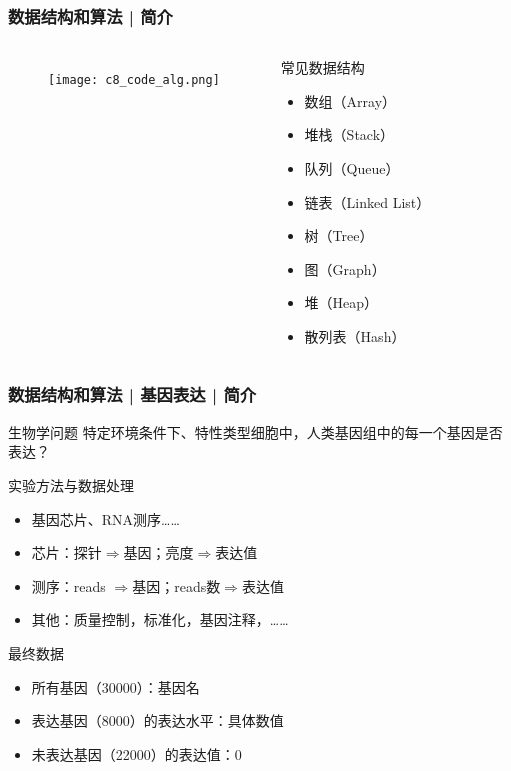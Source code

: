 \begin{frame}
  \frametitle{数据结构和算法 | 简介}
  \begin{columns}
    \begin{figure}
      \centering
      \texttt{[image: c8\_code\_alg.png]}
    \end{figure}
  \begin{block}{常见数据结构}
    \begin{itemize}
      \item 数组（Array）
      \item 堆栈（Stack）
      \item 队列（Queue）
      \item 链表（Linked List）
      \item 树（Tree）
      \item 图（Graph）
      \item 堆（Heap）
      \item 散列表（Hash）
    \end{itemize}
  \end{block}
\end{columns}
\end{frame}

\begin{frame}
  \frametitle{数据结构和算法 | 基因表达 | 简介}
  \begin{block}{生物学问题}
    特定环境条件下、特性类型细胞中，人类基因组中的每一个基因是否表达？
  \end{block}
  \pause
  \begin{block}{实验方法与数据处理}
    \begin{itemize}
      \item 基因芯片、RNA测序……
      \item 芯片：探针$\Rightarrow$基因；亮度$\Rightarrow$表达值
      \item 测序：reads $\Rightarrow$基因；reads数$\Rightarrow$表达值
      \item 其他：质量控制，标准化，基因注释，……
    \end{itemize}
  \end{block}
  \pause
  \begin{block}{最终数据}
    \begin{itemize}
      \item 所有基因（30000）：基因名
      \item 表达基因（8000）的表达水平：具体数值
      \item 未表达基因（22000）的表达值：0
    \end{itemize}
  \end{block}
\end{frame}

